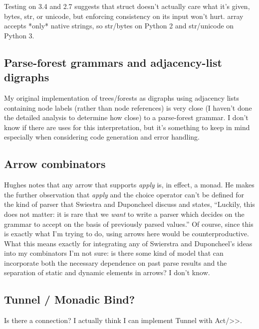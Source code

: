 \documentclass[12pt]{article}
\begin{document}
Testing on 3.4 and 2.7 suggests that struct doesn't actually care what
it's given, bytes, str, or unicode, but enforcing consistency on its
input won't hurt.  array accepts *only* native strings, so str/bytes
on Python 2 and str/unicode on Python 3.


\subsection{Parse-forest grammars and adjacency-list digraphs}
\label{sec:parse-forest_grammars_adjacency-list_digraphs}

My original implementation of trees/forests as digraphs using
adjacency lists containing node labels (rather than node references)
is very close (I haven't done the detailed analysis to determine how
close) to a parse-forest grammar.  I don't know if there are uses for
this interpretation, but it's something to keep in mind especially
when considering code generation and error handling.


\subsection{Arrow combinators}
\label{sec:arrow_combinators}

Hughes notes that any arrow that supports \emph{apply} is, in effect,
a monad.  He makes the further observation that \emph{apply} and the
choice operator can't be defined for the kind of parser that Swiestra
and Duponcheel discuss and states, ``Luckily, this does not matter: it
is rare that we \emph{want} to write a parser which decides on the
grammar to accept on the basis of previously parsed values.''  Of
course, since this is exactly what I'm trying to do, using arrows here
would be counterproductive.  What this means exactly for integrating
any of Swierstra and Duponcheel's ideas into my combinators I'm not
sure: is there some kind of model that can incorporate both the
necessary dependence on past parse results and the separation of
static and dynamic elements in arrows?  I don't know.


\subsection{Tunnel / Monadic Bind?}
\label{sec:tunnel_bind}

Is there a connection?  I actually think I can implement Tunnel with
Act/>>.



\printbibliography
\end{document}
